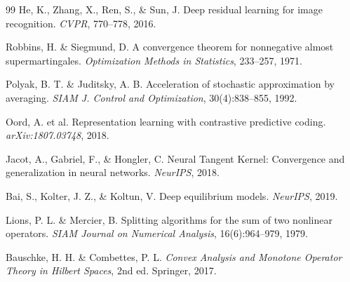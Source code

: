 \documentclass[12pt,a4paper]{article}
\theoremstyle{definition}
\theoremstyle{remark}
\begin{document}
\begin{thebibliography}{99}
 He, K., Zhang, X., Ren, S., \& Sun, J. Deep residual learning for image recognition. \textit{CVPR}, 770–778, 2016.

 Robbins, H. \& Siegmund, D. A convergence theorem for nonnegative almost supermartingales. \textit{Optimization Methods in Statistics}, 233–257, 1971.

 Polyak, B. T. \& Juditsky, A. B. Acceleration of stochastic approximation by averaging. \textit{SIAM J. Control and Optimization}, 30(4):838–855, 1992.

 Oord, A. et al. Representation learning with contrastive predictive coding. \textit{arXiv:1807.03748}, 2018.

 Jacot, A., Gabriel, F., \& Hongler, C. Neural Tangent Kernel: Convergence and generalization in neural networks. \textit{NeurIPS}, 2018.

 Bai, S., Kolter, J. Z., \& Koltun, V. Deep equilibrium models. \textit{NeurIPS}, 2019.

 Lions, P. L. \& Mercier, B. Splitting algorithms for the sum of two nonlinear operators. \textit{SIAM Journal on Numerical Analysis}, 16(6):964–979, 1979.

 Bauschke, H. H. \& Combettes, P. L. \textit{Convex Analysis and Monotone Operator Theory in Hilbert Spaces}, 2nd ed. Springer, 2017.

\end{thebibliography}
\end{document}
